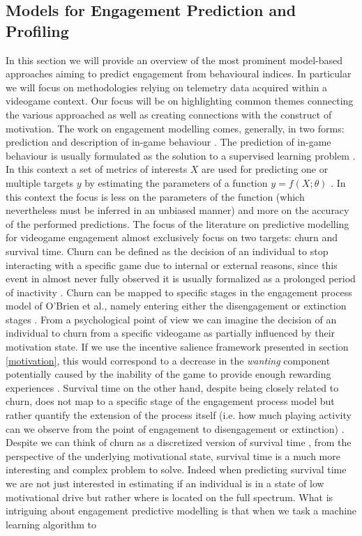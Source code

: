 \subsection{Models for Engagement Prediction and Profiling}
\label{engagement_prediction}
In this section we will provide an overview of the most prominent model-based approaches aiming to predict engagement from behavioural indices. In particular we will focus on methodologies relying on telemetry data acquired within a videogame context. Our focus will be on highlighting common themes connecting the various approached as well as creating connections with the construct of motivation. The work on engagement modelling comes, generally, in two forms: prediction and description of in-game behaviour \cite{el2016game}. The prediction of in-game behaviour is usually formulated as the solution to a supervised learning problem \cite{el2016game}. In this context a set of metrics of interests $X$ are used for predicting one or multiple targets $y$ by estimating the parameters of a function $y = f(X; \theta)$ \cite{bishop2006pattern}. In this context the focus is less on the parameters of the function (which nevertheless must be inferred in an unbiased manner) and more on the accuracy of the performed predictions. The focus of the literature on predictive modelling for videogame engagement almost exclusively focus on two targets: churn and survival time. Churn can be defined as the decision of an individual to stop interacting with a specific game due to internal or external reasons, since this event in almost never fully observed it is usually formalized as a prolonged period of inactivity \cite{hadiji2014predicting,runge2014churn, drachen2016rapid,milovsevic2017early, kim2017churn}. Churn can be mapped to specific stages in the engagement process model of O'Brien et al., namely entering either the disengagement or extinction stages \cite{o2008user}. From a psychological point of view we can imagine the decision of an individual to churn from a specific videogame as partially influenced by their motivation state. If we use the incentive salience framework presented in section \ref{motivation}, this would correspond to a decrease in the \textit{wanting} component potentially caused by the inability of the game to provide enough rewarding experiences \cite{berridge2004motivation}. Survival time on the other hand, despite being closely related to churn, does not map to a specific stage of the engagement process model but rather quantify the extension of the process itself (i.e. how much playing activity can we observe from the point of engagement to disengagement or extinction) \cite{perianez2016churn, demediuk2018player, bertens2017games, kim2017churn, viljanen2018playtime}. Despite we can think of churn as a discretized version of survival time \cite{el2021game}, from the perspective of the underlying motivational state, survival time is a much more interesting and complex problem to solve. Indeed when predicting survival time we are not just interested in estimating  if an individual is in a state of low motivational drive but rather where is located on the full spectrum. What is intriguing about engagement predictive modelling is that when we task a machine learning algorithm to 